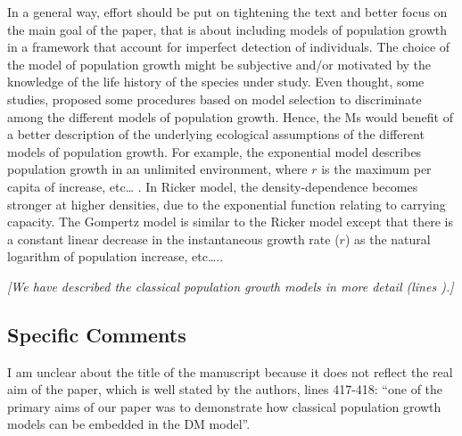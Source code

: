 \documentclass[12pt,english]{article}
\begin{document}
\begin{spacing}{1.9}
\begin{flushleft}
In a general way, effort should be put on tightening the text and better focus
on the main goal of the paper, that is about including models of population
growth in a framework that account for imperfect detection of individuals. The
choice of the model of population growth might be subjective and/or motivated by
the knowledge of the life history of the species under study. Even thought, some
studies, proposed some procedures based on model selection to discriminate among
the different models of population growth. Hence, the Ms would benefit of a
better description of the underlying ecological assumptions of the different
models of population growth. For example, the exponential model describes
population growth in an unlimited environment, where $r$ is the maximum per capita
of increase, etc… . In Ricker model, the density-dependence becomes stronger at
higher densities, due to the exponential function relating to carrying capacity.
The Gompertz model is similar to the Ricker model except that there is a
constant linear decrease in the instantaneous growth rate ($r$) as the natural
logarithm of population increase, etc…..

\vspace{0.5cm}
\textit{[We have described the classical population growth models in more 
detail (lines ).]}
\vspace{0.5cm}

\subsection*{Specific Comments}
I am unclear about the title of the manuscript because it does not reflect the real aim of the
paper, which is well stated by the authors, lines 417-418: ``one of the primary aims of our
paper was to demonstrate how classical population growth models can be embedded in the
DM model''.


\end{flushleft}
\end{spacing}
\end{document}
